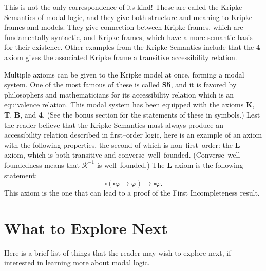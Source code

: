 \documentclass[12pt]{article}
\renewcommand{\phi}{\varphi}
\begin{document}
This is not the only correspondence of its kind! These are called the Kripke Semantics of modal logic, and they give both structure and meaning to
Kripke frames and models. They give connection between Kripke frames, which are fundamentally syntactic, and Kripke frames, which have a more
semantic basis for their existence. Other examples from the Kripke Semantics include that the \textbf{4} axiom gives the associated Kripke frame 
a transitive accessibility relation. 

Multiple axioms can be given to the Kripke model at once, forming a modal system. One of the most famous of these is called \textbf{S5}, and it
is favored by philosophers and mathematicians for its accessibility relation which is an equivalence relation. This modal system has been
equipped with the axioms \textbf{K}, \textbf{T}, \textbf{B}, and \textbf{4}. (See the bonus section for the statements of these in symbols.) Lest the reader
believe that the Kripke Semantics must always produce an accessibility relation described in first--order logic, here is an example of an axiom
with the following properties, the second of which is non--first--order: the \textbf{L} axiom, which is both transitive and converse--well--founded.
(Converse--well--foundedness means that $\mathcal{R}^{-1}$ is well--founded.) The \textbf{L} axiom is the following statement:
$$\square (\square \phi \rightarrow \phi) \rightarrow \square \phi.$$ This axiom is the one that can lead to a proof of the First Incompleteness
result.

\section{What to Explore Next}
Here is a brief list of things that the reader may wish to explore next, if interested in learning more about modal logic. 
\end{document}
